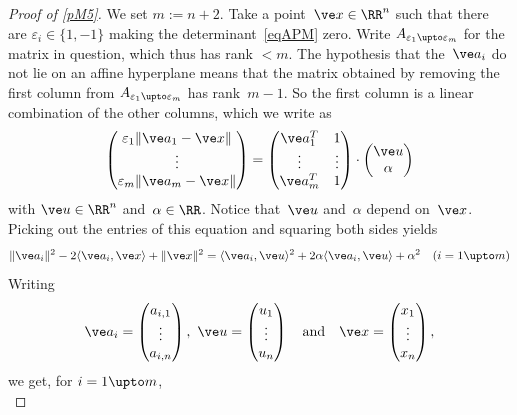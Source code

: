 \documentclass[reqno]{amsart}
\begin{document}
\begin{proof}[Proof of \cref{pM5}]
  We set $m := n+2$. Take a point~$\ve x \in \RR^n$ such that there
  are $\varepsilon_i \in \{1,-1\}$ making the
  determinant~\eqref{eqAPM} zero. Write
  $A_{\varepsilon_1 \upto \varepsilon_m}$ for the matrix in question,
  which thus has rank $< m$. The hypothesis that the~$\ve a_i$ do not
  lie on an affine hyperplane means that the matrix obtained by
  removing the first column from
  $A_{\varepsilon_1 \upto \varepsilon_m}$ has rank~$m-1$. So the first
  column is a linear combination of the other columns, which we write
  as
  \[
    \begin{pmatrix}
      \varepsilon_1 \lVert\ve a_1 - \ve x\rVert \\
      \vdots \\
      \varepsilon_m \lVert\ve a_m - \ve x\rVert
    \end{pmatrix}
    =
    \begin{pmatrix}
      \ve a_1^T & 1 \\
      \vdots & \vdots \\
      \ve a_m^T & 1
    \end{pmatrix} \cdot
    \begin{pmatrix}
      \ve u \\
      \alpha
    \end{pmatrix}
  \]
  with $\ve u \in \RR^n$ and~$\alpha \in \RR$. Notice that~$\ve u$
  and~$\alpha$ depend on~$\ve x$. Picking out the entries of this
  equation and squaring both sides yields
  \[
    \lVert\ve a_i\rVert^2 - 2\langle\ve a_i,\ve x\rangle +
    \lVert\ve x\rVert^2 = \langle\ve a_i,\ve u\rangle^2 + 2 \alpha
    \langle\ve a_i,\ve u\rangle + \alpha^2 \quad (i = 1 \upto m)
  \]
  Writing
  \[
    \ve a_i =
    \begin{pmatrix}
      a_{i,1} \\ \vdots \\ a_{i,n}
    \end{pmatrix}, \ \ve u =
    \begin{pmatrix}
      u_1 \\ \vdots \\ u_n
    \end{pmatrix} \quad \text{and} \quad \ve x =
    \begin{pmatrix}
      x_1 \\ \vdots \\ x_n
    \end{pmatrix},
  \]
  we get, for $i = 1 \upto m$,
  \begin{equation} \label{eqAUXAlpha}%

\end{equation}
\end{proof}
\end{document}
